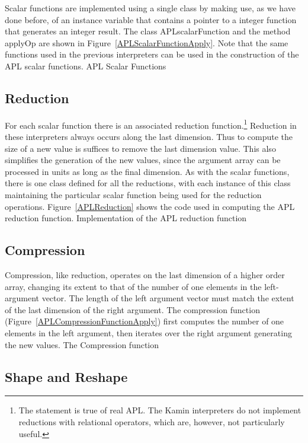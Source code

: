 Scalar functions are implemented using a single class by making use, as we have
done before, of an instance variable that contains a pointer to a integer
function that generates an integer result.  The class {\sf APLscalarFunction}
and the method {\sf applyOp} are shown in Figure~\ref{APLScalarFunctionApply}.
Note that the same functions used in the previous interpreters can be used in
the construction of the APL scalar functions.
%
{APL Scalar Functions}

\subsection{Reduction}

For each scalar function there is an associated reduction function.\footnote{The
    statement is true of real APL.  The Kamin interpreters do not implement
    reductions with relational operators, which are, however, not particularly
    useful.}  Reduction in these interpreters always occurs along the last
dimension.  Thus to compute the size of a new value is suffices to remove the
last dimension value.  This also simplifies the generation of the new values,
since the argument array can be processed in units as long as the final
dimension.  As with the scalar functions, there is one class defined for all the
reductions, with each instance of this class maintaining the particular scalar
function being used for the reduction operations.  Figure~\ref{APLReduction}
shows the code used in computing the APL reduction function.
%
{Implementation of the APL reduction function}

\subsection{Compression}

Compression, like reduction, operates on the last dimension of a higher order
array, changing its extent to that of the number of one elements in the
left-argument vector.  The length of the left argument vector must match the
extent of the last dimension of the right argument.  The compression function
(Figure~\ref{APLCompressionFunctionApply}) first computes the number of one
elements in the left argument, then iterates over the right argument generating
the new values.
%
{The Compression function}

\subsection{Shape and Reshape}

